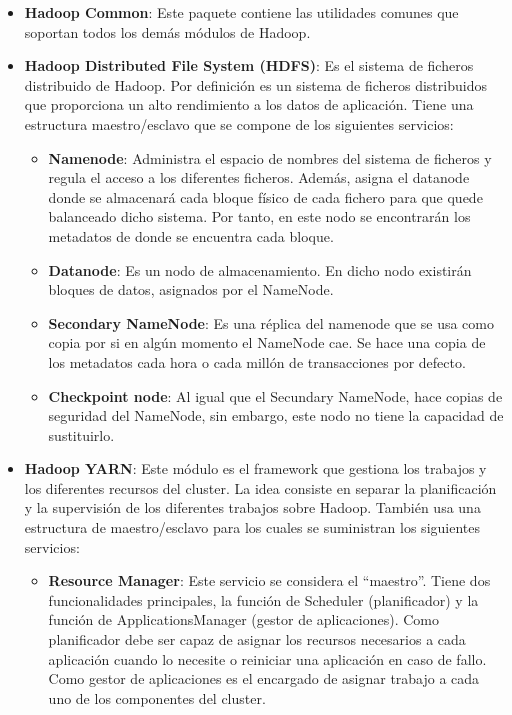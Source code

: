 \begin{itemize}
        \item \textbf{Hadoop Common}: Este paquete contiene las utilidades comunes que soportan todos los demás módulos de Hadoop.
        \item \textbf{Hadoop Distributed File System (HDFS)}: Es el sistema de ficheros distribuido de Hadoop. Por definición es un sistema de ficheros distribuidos que proporciona un alto rendimiento a los datos de aplicación. Tiene una estructura maestro/esclavo que se compone de los siguientes servicios:
        \begin{itemize}
                \item \textbf{Namenode}: Administra el espacio de nombres del sistema de ficheros y regula el acceso a los diferentes ficheros. Además, asigna el datanode donde se almacenará cada bloque físico de cada fichero para que quede balanceado dicho sistema. Por tanto, en este nodo se encontrarán los metadatos de donde se encuentra cada bloque.
                \item \textbf{Datanode}: Es un nodo de almacenamiento. En dicho nodo existirán bloques de datos, asignados por el NameNode.
                \item \textbf{Secondary NameNode}: Es una réplica del namenode que se usa como copia por si en algún momento el NameNode cae. Se hace una copia de los metadatos cada hora o cada millón de transacciones por defecto.
                \item \textbf{Checkpoint node}: Al igual que el Secundary NameNode, hace copias de seguridad del NameNode, sin embargo, este nodo no tiene la capacidad de sustituirlo.
        \end{itemize}
        \item \textbf{Hadoop YARN}: Este módulo es el framework que gestiona los trabajos y los diferentes recursos del cluster. La idea consiste en separar la planificación y la supervisión de los diferentes trabajos sobre Hadoop. También usa una estructura de maestro/esclavo para los cuales se suministran los siguientes servicios:
        \begin{itemize}
                \item \textbf{Resource Manager}: Este servicio se considera el “maestro”. Tiene dos funcionalidades principales, la función de Scheduler (planificador) y la función de ApplicationsManager (gestor de aplicaciones). Como planificador debe ser capaz de asignar los recursos necesarios a cada aplicación cuando lo necesite o reiniciar una aplicación en caso de fallo. Como gestor de aplicaciones es el encargado de asignar trabajo a cada uno de los componentes del cluster.

\end{itemize}
\end{itemize}
